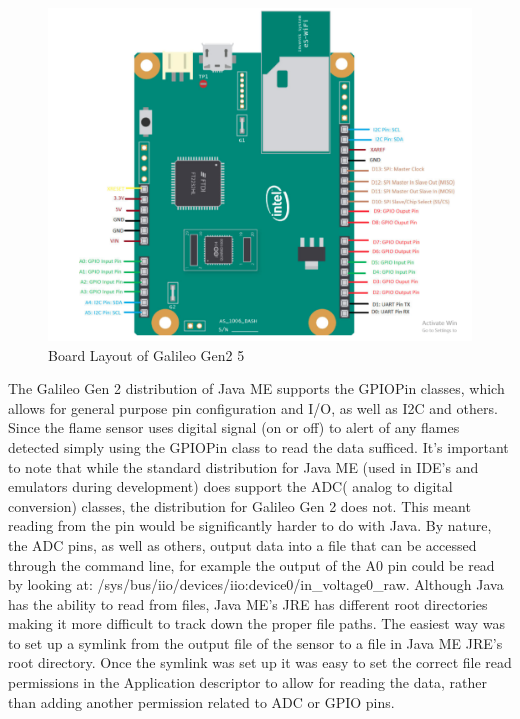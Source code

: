  \begin{figure}[t]
	\centering
	\includegraphics[width=14cm,height=0.7\textheight,keepaspectratio]{./figures/figure_9}
	\center\caption[font=footnote]{Board Layout of Galileo Gen2 5}
\end{figure}

The Galileo Gen 2 distribution of Java ME supports the GPIOPin classes, which allows for general purpose pin configuration and I/O, as well as I2C and others. Since the flame sensor uses digital signal (on or off) to alert of any flames detected  simply using the GPIOPin class to read the data sufficed.  It's important to note that while the standard distribution for Java ME (used in IDE's and emulators during development) does support the ADC( analog to digital conversion) classes, the distribution for Galileo Gen 2 does not. This meant reading from the pin would be significantly harder to do with Java. By nature, the ADC pins, as well as others, output data into a file that can be accessed through the command line, for example the output of the A0 pin could be read by looking at:  /sys/bus/iio/devices/iio:device0/in\_voltage0\_raw. Although Java has the ability to read from files, Java ME's JRE has different root directories making it more difficult to track down the proper file paths. The easiest way was to set up a symlink from the output file of the sensor to a file in Java ME JRE's root directory. Once the symlink was set up it was easy to set the correct file read permissions in the Application descriptor to allow for reading the data, rather than adding another permission related to ADC or GPIO pins.

